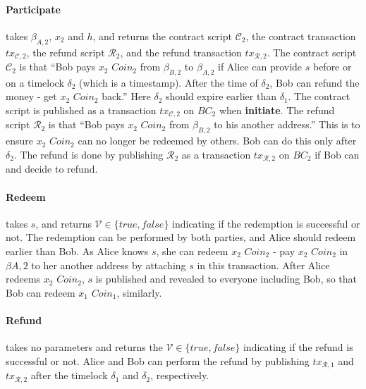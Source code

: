\paragraph{\textbf{Participate}}
takes $\beta_{A, 2}$, $x_2$ and $h$,
and returns the contract script $\mathcal{C}_2$, the contract transaction $tx_{\mathcal{C}, 2}$, the refund script $\mathcal{R}_2$, and the refund transaction $tx_{\mathcal{R}, 2}$.
The contract script $\mathcal{C}_2$ is that ``Bob pays $x_2$ $Coin_2$ from $\beta_{B, 2}$ to $\beta_{A, 2}$ if Alice can provide $s$ before or on a timelock $\delta_2$ (which is a timestamp). After the time of $\delta_2$, Bob can refund the money - get $x_2$ $Coin_2$ back.''
Here $\delta_2$ should expire earlier than $\delta_1$.
The contract script is published as a transaction $tx_{\mathcal{C}, 2}$ on $BC_2$ when \textbf{initiate}.
The refund script $\mathcal{R}_2$ is that ``Bob pays $x_2$ $Coin_2$ from $\beta_{B, 2}$ to his another address.'' This is to ensure $x_2$ $Coin_2$ can no longer be redeemed by others. Bob can do this only after $\delta_2$.
The refund is done by publishing $\mathcal{R}_2$ as a transaction $tx_{\mathcal{R}, 2}$ on $BC_2$ if Bob can and decide to refund.


\paragraph{\textbf{Redeem}}
takes $s$,
and returns $\mathcal{V} \in \{true, false\}$ indicating if the redemption is successful or not.
The redemption can be performed by both parties, and Alice should redeem earlier than Bob.
As Alice knows $s$, she can redeem $x_2$ $Coin_2$ - pay $x_2$ $Coin_2$ in $\beta{A, 2}$ to her another address by attaching $s$ in this transaction.
After Alice redeems $x_2$ $Coin_2$, $s$ is published and revealed to everyone including Bob, so that Bob can redeem $x_1$ $Coin_1$, similarly.

\paragraph{\textbf{Refund}}
takes no parameters and returns the $\mathcal{V} \in \{true, false\}$ indicating if the refund is successful or not.
Alice and Bob can perform the refund by publishing $tx_{\mathcal{R}, 1}$ and $tx_{\mathcal{R}, 2}$ after the timelock $\delta_1$ and $\delta_2$, respectively.

